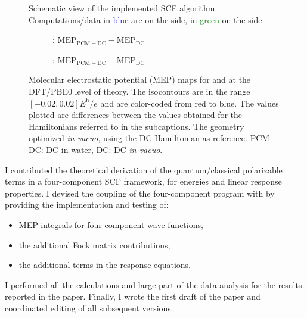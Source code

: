 \begin{figure}[!htb]
\centering
\scalebox{0.8}{}
\caption[Modular approach to programming a \acs{PCM} functionality into an existing \acs{SCF} code.]{
  Schematic view of the implemented SCF algorithm. Computations/data in
  \textcolor{Blue}{blue} are on the \pcmsolver side, in
  \textcolor{Green}{green} on the \DIRAC side.
  }
\label{fig:algorithm}
\end{figure}

\begin{figure}
\centering
\begin{subfigure}[b]{0.5\textwidth}
\caption{: $\mathrm{MEP}_\mathrm{PCM-DC} - \mathrm{MEP}_\mathrm{DC}$}
\label{fig:H2Odiff_pcmdc-dc}
\end{subfigure}%
\begin{subfigure}[b]{0.5\textwidth}
\caption{: $\mathrm{MEP}_\mathrm{PCM-DC} - \mathrm{MEP}_\mathrm{DC}$}
\label{fig:H2Podiff_pcmdc-dc}
\end{subfigure}
\caption[Molecular electrostatic potential (\acs{MEP}) maps for  and  at
  the \acs{DFT}/PBE0 level of theory.]{
  Molecular electrostatic potential (\acs{MEP}) maps for  and  at
  the \acs{DFT}/PBE0 level of theory.
  The isocontours are in the range $[-0.02, 0.02] \si{\hartree\per\elementarycharge}$ and are
  color-coded from red to blue.
  The values plotted are differences between the values obtained for the
  Hamiltonians referred to in the subcaptions. The geometry optimized \emph{in
  vacuo}, using the \acl{DC} Hamiltonian as reference.
  \acs{PCM}-\acs{DC}: \acl{DC} in water, \acs{DC}: \acl{DC} \emph{in vacuo}.}
\label{fig:MEP_maps}
\end{figure}

I contributed the theoretical derivation of the quantum/classical polarizable
terms in a four-component \acs{SCF} framework, for energies and linear response
properties. I devised the coupling of the four-component program \DIRAC with
\pcmsolver by providing the implementation and testing of:
\begin{itemize}
  \item \acs{MEP} integrals for four-component wave functions,
  \item the additional Fock matrix contributions,
  \item the additional terms in the response equations.
\end{itemize}
I performed all the calculations and large part of the data analysis
for the results reported in the paper.
Finally, I wrote the first draft of the paper and coordinated editing of
all subsequent versions.

